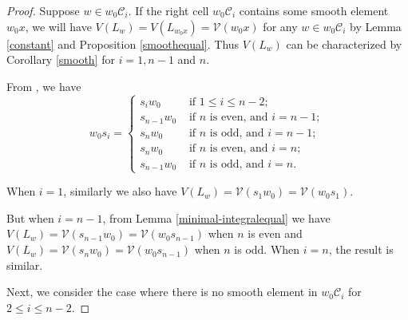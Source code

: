 \documentclass[11pt, reqno]{amsart}
\theoremstyle{definition}
\numberwithin{equation}{section}
\begin{document}
\begin{proof}
  Suppose $w\in w_0\mathcal{C}_i$. If the right cell $w_0\mathcal{C}_i$ contains some smooth element $w_0x$, we will have $V(L_w)=V(L_{w_0x})=\mathcal{V}(w_0x)$ for any $w\in w_0\mathcal{C}_i$ by Lemma \ref{constant} and Proposition \ref{smoothequal}. Thus 
$V(L_{w})$ can be characterized by Corollary \ref{smooth} for $i=1, n-1$ and $n$.

 


From \cite[\S 2.3 and Exer. 4.10]{BB05}, we have $$w_0s_i=\begin{cases}
s_iw_0 &  \text{~if~} 1\leq i\leq n-2;\\
s_{n-1}w_0  &  \text{~if~$n$~is~even, and~} i=n-1;\\
s_{n}w_0  &  \text{~if~$n$~is~odd, and~} i=n-1;\\
s_{n}w_0  &  \text{~if~$n$~is~even, and~} i=n;\\
s_{n-1}w_0  &  \text{~if~$n$~is~odd, and~} i=n.
\end{cases}$$

 When $i=1$, similarly we also have $V(L_w)=\mathcal V(s_1w_0)=\mathcal V(w_0s_1)$.

 But when $i=n-1$, from Lemma \ref{minimal-integralequal} we have 
 $V(L_w)=\mathcal V(s_{n-1}w_0)=\mathcal V(w_0s_{n-1})$ when $n$ is even and $V(L_w)=\mathcal V(s_{n}w_0)=\mathcal V(w_0s_{n-1})$ when $n$ is odd. When $i=n$, the result is similar.

 Next, we consider the case where there is no smooth element in $w_0\mathcal{C}_i$ for $2\leq i\leq n-2$. 
 

\end{proof}
\end{document}

